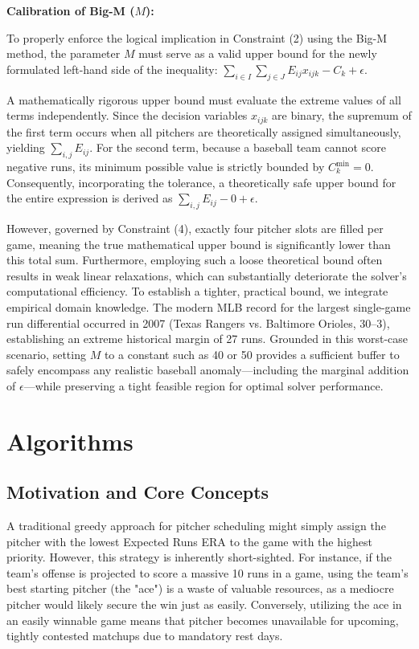 \documentclass[11pt, a4paper]{article}
\begin{document}
\textbf{Calibration of Big-M ($M$):}

To properly enforce the logical implication in Constraint (2) using the Big-M method, the parameter $M$ must serve as a valid upper bound for the newly formulated left-hand side of the inequality: $\sum_{i \in I} \sum_{j \in J} E_{ij}x_{ijk} - C_k + \epsilon$.

A mathematically rigorous upper bound must evaluate the extreme values of all terms independently. Since the decision variables $x_{ijk}$ are binary, the supremum of the first term occurs when all pitchers are theoretically assigned simultaneously, yielding $\sum_{i,j} E_{ij}$. For the second term, because a baseball team cannot score negative runs, its minimum possible value is strictly bounded by $C_k^{\min} = 0$. Consequently, incorporating the tolerance, a theoretically safe upper bound for the entire expression is derived as $\sum_{i,j} E_{ij} - 0 + \epsilon$.

However, governed by Constraint (4), exactly four pitcher slots are filled per game, meaning the true mathematical upper bound is significantly lower than this total sum. Furthermore, employing such a loose theoretical bound often results in weak linear relaxations, which can substantially deteriorate the solver's computational efficiency. To establish a tighter, practical bound, we integrate empirical domain knowledge. The modern MLB record for the largest single-game run differential occurred in 2007 (Texas Rangers vs. Baltimore Orioles, 30--3), establishing an extreme historical margin of 27 runs. Grounded in this worst-case scenario, setting $M$ to a constant such as 40 or 50 provides a sufficient buffer to safely encompass any realistic baseball anomaly---including the marginal addition of $\epsilon$---while preserving a tight feasible region for optimal solver performance.


\section{Algorithms}

\subsection{Motivation and Core Concepts}
A traditional greedy approach for pitcher scheduling might simply assign the pitcher with the lowest Expected Runs ERA to the game with the highest priority.
However, this strategy is inherently short-sighted.
For instance, if the team's offense is projected to score a massive 10 runs in a game, using the team's best starting pitcher (the "ace") is a waste of valuable resources, as a mediocre pitcher would likely secure the win just as easily.
Conversely, utilizing the ace in an easily winnable game means that pitcher becomes unavailable for upcoming, tightly contested matchups due to mandatory rest days.
\end{document}
